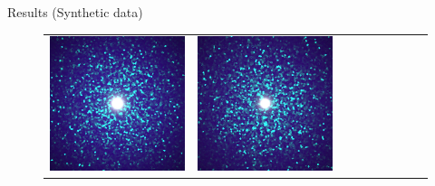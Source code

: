 \documentclass[final]{beamer}
\newlength{\twocolwid}
\newlength{\resultwidth}
\begin{document}
\begin{frame}[t]
\begin{columns}[t]
\begin{column}{\twocolwid}
\begin{block}{Results (Synthetic data)}
\begin{figure}[t]
\begin{tabular}{ccrclcccc}
            		\includegraphics[width=\resultwidth]{synth/flake/good1.jpg} &
            		\includegraphics[width=\resultwidth]{synth/flake/good2.jpg} &

\end{tabular}
\end{figure}
\end{block}
\end{column}
\end{columns}
\end{frame}
\end{document}
